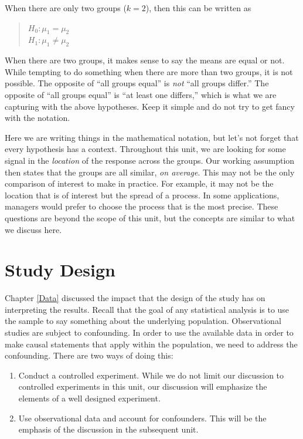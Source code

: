 \documentclass[]{book}
\providecommand{\tightlist}{%
  \setlength{\itemsep}{0pt}\setlength{\parskip}{0pt}}
\theoremstyle{definition}
\theoremstyle{definition}
\theoremstyle{remark}
\let\BeginKnitrBlock\begin \let\EndKnitrBlock\end
\begin{document}
When there are only two groups (\(k = 2\)), then this can be written as

\begin{quote}
\(H_0: \mu_1 = \mu_2\)\\
\(H_1: \mu_1 \neq \mu_2\)
\end{quote}

\BeginKnitrBlock{rmdtip}
When there are two groups, it makes sense to say the means are equal or
not. While tempting to do something when there are more than two groups,
it is not possible. The opposite of ``all groups equal'' is \emph{not}
``all groups differ.'' The opposite of ``all groups equal'' is ``at
least one differs,'' which is what we are capturing with the above
hypotheses. Keep it simple and do not try to get fancy with the
notation.
\EndKnitrBlock{rmdtip}

Here we are writing things in the mathematical notation, but let's not
forget that every hypothesis has a context. Throughout this unit, we are
looking for some signal in the \emph{location} of the response across
the groups. Our working assumption then states that the groups are all
similar, \emph{on average}. This may not be the only comparison of
interest to make in practice. For example, it may not be the location
that is of interest but the spread of a process. In some applications,
managers would prefer to choose the process that is the most precise.
These questions are beyond the scope of this unit, but the concepts are
similar to what we discuss here.

\chapter{Study Design}\label{ANOVAdata}

Chapter \ref{Data} discussed the impact that the design of the study has
on interpreting the results. Recall that the goal of any statistical
analysis is to use the sample to say something about the underlying
population. Observational studies are subject to confounding. In order
to use the available data in order to make causal statements that apply
within the population, we need to address the confounding. There are two
ways of doing this:

\begin{enumerate}
\def\labelenumi{\arabic{enumi}.}
\tightlist
\item
  Conduct a controlled experiment. While we do not limit our discussion
  to controlled experiments in this unit, our discussion will emphasize
  the elements of a well designed experiment.
\item
  Use observational data and account for confounders. This will be the
  emphasis of the discussion in the subsequent unit.
\end{enumerate}
\end{document}

